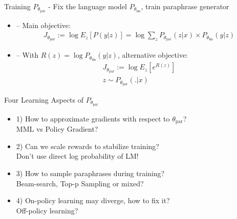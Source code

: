 \documentclass{beamer}
\begin{document}
\begin{frame}{Training $P_{\theta_{\text{par}}}$}
- Fix the language model $P_{\theta_{\text{lm}}}$, train paraphrase generator
\begin{itemize}
    \item -- Main objective:
    \begin{multline}
J_{\theta_{\text{par}}} := \log E_{z} [P(y | z)] = \log \sum_{z} P_{\theta_{\text{par}}}(z | x) \times P_{\theta_{\text{lm}}}(y | z)
\label{lmfp-main-objective}
\end{multline}

    \medskip
    \medskip

    \item -- With $R(z) = \log P_{\theta_{\text{lm}}} (y | z)$, alternative objective:\\
    \begin{multline}
J_{\theta_{\text{par}}}
:= \log E_{z} [e^{R(z)}] \\
z \sim P_{\theta_{\text{par}}}(.|x)
\label{lmfp-expect-objective}
\end{multline}

\end{itemize}
\end{frame}

\begin{frame}{Four Learning Aspects of $P_{\theta_{\text{par}}}$}
\begin{itemize}
    \item 1) How to approximate gradients with respect to $\theta_{\text{par}}$? \\
    {\color{brown}MML vs Policy Gradient?}
    \medskip
    \medskip
    \item 2) Can we scale rewards to stabilize training? \\
    {\color{brown}Don't use direct log probability of LM!}
    \medskip
    \medskip
    \item 3) How to sample paraphrases during training? \\
    {\color{brown}Beam-search, Top-p Sampling or mixed?}
    \medskip
    \medskip
    \item 4) On-policy learning may diverge, how to fix it? \\
    {\color{brown}Off-policy learning?}

\end{itemize}
\end{frame}
\end{document}
